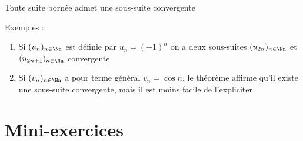 \begin{frame}
\begin{theoreme}
\label{thm:Bolzano_Weierstrass}
  Toute suite bornée admet une sous-suite convergente
\end{theoreme}

\pause
\bigskip
\bigskip

Exemples :
  \begin{enumerate}
    \item Si $(u_n)_{n\in \Nn}$ est définie par 
    $u_n=(-1)^n$ on a deux sous-suites $(u_{2n})_{n\in \Nn}$ 
et $(u_{2n+1})_{n\in \Nn}$ convergente

\pause
\medskip

    \item Si $(v_n)_{n\in \Nn}$ a pour terme général $v_n=\cos n$, 
le théorème affirme qu'il existe une sous-suite convergente, 
mais il est moins facile de l'expliciter
  \end{enumerate}

\end{frame}



 \section*{Mini-exercices}

